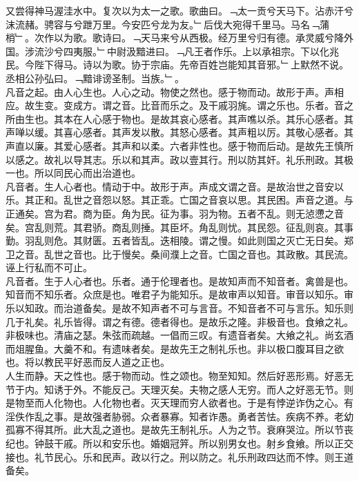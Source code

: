 \documentclass{zhvt-classic}
\begin{document}
\hspace*{2em}又尝得神马渥洼水中。复次以为太一之歌。歌曲曰。﹁太一贡兮天马下。沾赤汗兮沫流赭。骋容与兮跇万里。今安匹兮龙为友。﹂后伐大宛得千里马。马名﹁蒲梢﹂。次作以为歌。歌诗曰。﹁天马来兮从西极。经万里兮归有德。承灵威兮降外国。涉流沙兮四夷服。﹂中尉汲黯进曰。﹁凡王者作乐。上以承祖宗。下以化兆民。今陛下得马。诗以为歌。协于宗庙。先帝百姓岂能知其音邪。﹂上默然不说。丞相公孙弘曰。﹁黯诽谤圣制。当族。﹂。\\
\hspace*{2em}凡音之起。由人心生也。人心之动。物使之然也。感于物而动。故形于声。声相应。故生变。变成方。谓之音。比音而乐之。及干戚羽旄。谓之乐也。乐者。音之所由生也。其本在人心感于物也。是故其哀心感者。其声噍以杀。其乐心感者。其声啴以缓。其喜心感者。其声发以散。其怒心感者。其声粗以厉。其敬心感者。其声直以廉。其爱心感者。其声和以柔。六者非性也。感于物而后动。是故先王慎所以感之。故礼以导其志。乐以和其声。政以壹其行。刑以防其奸。礼乐刑政。其极一也。所以同民心而出治道也。\\
\hspace*{2em}凡音者。生人心者也。情动于中。故形于声。声成文谓之音。是故治世之音安以乐。其正和。乱世之音怨以怒。其正乖。亡国之音哀以思。其民困。声音之道。与正通矣。宫为君。商为臣。角为民。征为事。羽为物。五者不乱。则无惉懘之音矣。宫乱则荒。其君骄。商乱则捶。其臣坏。角乱则忧。其民怨。征乱则哀。其事勤。羽乱则危。其财匮。五者皆乱。迭相陵。谓之慢。如此则国之灭亡无日矣。郑卫之音。乱世之音也。比于慢矣。桑间濮上之音。亡国之音也。其政散。其民流。诬上行私而不可止。\\
\hspace*{2em}凡音者。生于人心者也。乐者。通于伦理者也。是故知声而不知音者。禽兽是也。知音而不知乐者。众庶是也。唯君子为能知乐。是故审声以知音。审音以知乐。审乐以知政。而治道备矣。是故不知声者不可与言音。不知音者不可与言乐。知乐则几于礼矣。礼乐皆得。谓之有德。德者得也。是故乐之隆。非极音也。食飨之礼。非极味也。清庙之瑟。朱弦而疏越。一倡而三叹。有遗音者矣。大飨之礼。尚玄酒而俎腥鱼。大羹不和。有遗味者矣。是故先王之制礼乐也。非以极口腹耳目之欲也。将以教民平好恶而反人道之正也。\\
\hspace*{2em}人生而静。天之性也。感于物而动。性之颂也。物至知知。然后好恶形焉。好恶无节于内。知诱于外。不能反己。天理灭矣。夫物之感人无穷。而人之好恶无节。则是物至而人化物也。人化物也者。灭天理而穷人欲者也。于是有悖逆诈伪之心。有淫佚作乱之事。是故强者胁弱。众者暴寡。知者诈愚。勇者苦怯。疾病不养。老幼孤寡不得其所。此大乱之道也。是故先王制礼乐。人为之节。衰麻哭泣。所以节丧纪也。钟鼓干戚。所以和安乐也。婚姻冠笄。所以别男女也。射乡食飨。所以正交接也。礼节民心。乐和民声。政以行之。刑以防之。礼乐刑政四达而不悖。则王道备矣。\\
\end{document}
